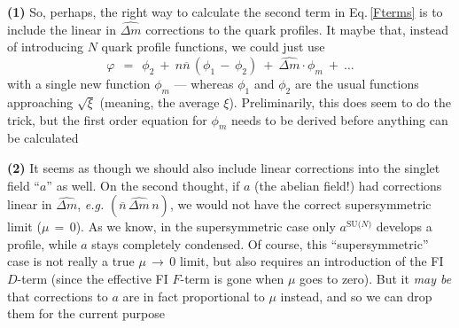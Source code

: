 \documentclass[12pt]{article}
\newcommand{\ov}{\overline}
\newcommand{\aN}{a^\text{SU($N$)}}
\newcommand{\nbar}{\ov{n}}
\newcommand{\dm}{\hat{{\scriptstyle \Delta} m}}
\begin{document}
\pagebreak
	{\bf (1)}\;\;  So, perhaps, the right way to calculate the second term in Eq.\,\eqref{Fterms} is to include the linear in $ \dm $ corrections
	to the quark profiles. 
	It maybe that, instead of introducing $ N $ quark profile functions, we could just use
\[
	\varphi ~~=~~ \phi_2  ~+~  n\nbar\, (\phi_1 \,-\, \phi_2)  ~+~  \dm \cdot \phi_m  ~+~ \dots
\]
	with a single new function $ \phi_m $ --- whereas $ \phi_1 $ and $ \phi_2 $ are the usual functions approaching $ \sqrt{\xi} $
	(meaning, the average $ \xi $).
	Preliminarily, this does seem to do the trick, but the first order equation for $ \phi_m $ needs
	to be derived before anything can be calculated


\vspace{0.8cm}


	{\bf (2)}\;\;  It seems as though we should also include linear corrections into the singlet field ``$ a $'' as well.
	On the second thought, if $ a $ (the abelian field!) had corrections linear in $ \dm $, {\it e.g.}
$ (\nbar\, \dm\, n) $,
	we would not have the correct
	supersymmetric limit ($ \mu \,=\, 0 $). As we know, in the supersymmetric case only $ \aN $ develops a profile, while
	$ a $ stays completely condensed. Of course, this ``supersymmetric'' case is not really a true $ \mu \,\longrightarrow\, 0 $ limit,
	but also requires an introduction of the FI $ D $-term (since the effective FI $ F $-term is gone when $ \mu $ goes to zero).
	But it \emph{may be} that corrections to $ a $ are in fact proportional to $ \mu $ instead, and so we can drop them
	for the current purpose
\end{document}
